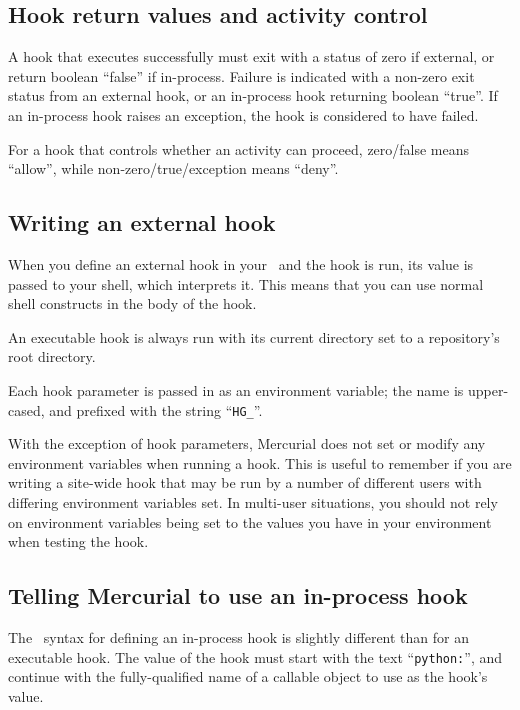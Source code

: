 \subsection{Hook return values and activity control}

A hook that executes successfully must exit with a status of zero if
external, or return boolean ``false'' if in-process.  Failure is
indicated with a non-zero exit status from an external hook, or an
in-process hook returning boolean ``true''.  If an in-process hook
raises an exception, the hook is considered to have failed.

For a hook that controls whether an activity can proceed, zero/false
means ``allow'', while non-zero/true/exception means ``deny''.

\subsection{Writing an external hook}

When you define an external hook in your \hgrc\ and the hook is run,
its value is passed to your shell, which interprets it.  This means
that you can use normal shell constructs in the body of the hook.

An executable hook is always run with its current directory set to a
repository's root directory.

Each hook parameter is passed in as an environment variable; the name
is upper-cased, and prefixed with the string ``\texttt{HG\_}''.

With the exception of hook parameters, Mercurial does not set or
modify any environment variables when running a hook.  This is useful
to remember if you are writing a site-wide hook that may be run by a
number of different users with differing environment variables set.
In multi-user situations, you should not rely on environment variables
being set to the values you have in your environment when testing the
hook.

\subsection{Telling Mercurial to use an in-process hook}

The \hgrc\ syntax for defining an in-process hook is slightly
different than for an executable hook.  The value of the hook must
start with the text ``\texttt{python:}'', and continue with the
fully-qualified name of a callable object to use as the hook's value.

